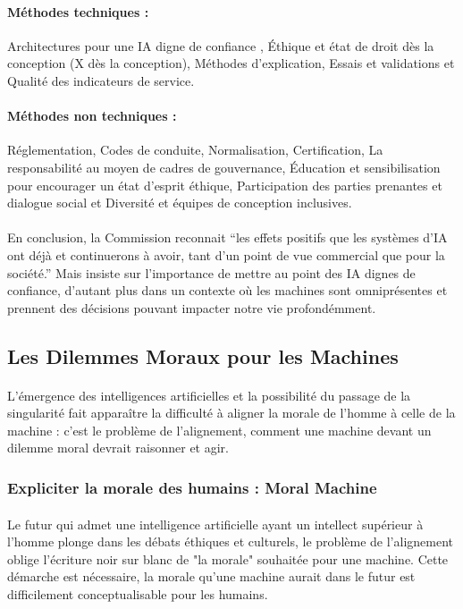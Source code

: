 \documentclass[10pt, french, a4paper]{report}
\begin{document}
\paragraph{Méthodes techniques :} Architectures pour une IA digne de confiance , Éthique et état de droit dès la conception (X dès la conception), Méthodes d’explication, Essais et validations et Qualité des indicateurs de service.

\paragraph{Méthodes non techniques :} Réglementation, Codes de conduite, Normalisation, Certification, La responsabilité au moyen de cadres de gouvernance, Éducation et sensibilisation pour encourager un état d’esprit éthique, Participation des parties prenantes et dialogue social et Diversité et équipes de conception inclusives.

\paragraph{}
En conclusion, la Commission reconnait ``les effets positifs que les systèmes d’IA ont déjà et continuerons à avoir, tant d’un point de vue commercial que pour la société.'' Mais insiste sur l'importance de mettre au point des IA dignes de confiance, d'autant plus dans un contexte où les machines sont omniprésentes et prennent des décisions pouvant impacter notre vie profondémment.

\subsection{Les Dilemmes Moraux pour les Machines}

\paragraph{}
L’émergence des intelligences artificielles et la possibilité du passage de la singularité fait apparaître la difficulté à aligner la morale de l’homme à celle de la machine : c’est le problème de l’alignement, comment une machine devant un dilemme moral devrait raisonner et agir.

\subsubsection{Expliciter la morale des humains : Moral Machine}

\paragraph{}
Le futur qui admet une intelligence artificielle ayant un intellect supérieur à l’homme plonge dans les débats éthiques et culturels, le problème de l’alignement oblige l'écriture noir sur blanc de "la morale" souhaitée pour une machine. Cette démarche est nécessaire, la morale qu’une machine aurait dans le futur est difficilement conceptualisable pour les humains.
\end{document}
